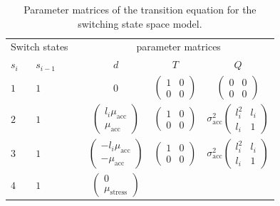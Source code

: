 \documentclass[aoas]{imsart}
\begin{document}
\begin{table}
  \caption{Parameter matrices of the transition equation for the switching state space model.\label{tab:parmats}}
\centering
\begin{tabular}[h!]{@{}llcccc@{}}
\toprule
  \multicolumn{2}{c}{Switch states} &\phantom{a}& \multicolumn{3}{c}{parameter
                                      matrices}\\
  \cmidrule{1-2} \cmidrule{4-6}
  $s_i$ & $s_{i-1}$ && $d$ & $T$ & $Q$ \\
  \midrule
  $1$ &  $1$ && 0 & $\begin{pmatrix}1&0\\0&0\end{pmatrix}$ 
                 & $\begin{pmatrix}0&0\\0&0\end{pmatrix}$\\
  $2$ & $1$ && $\begin{pmatrix} l_i\mu_{\textrm{acc}}\\ \mu_{\textrm{acc}}\end{pmatrix}$ 
                                    & $\begin{pmatrix} 1 & 0 \\ 0 &
                                      0 \end{pmatrix}$ 
        & $\sigma_{\textrm{acc}}^2\begin{pmatrix} l_i^2 & l_i\\ l_i & 1 \end{pmatrix}$\\
  $3$ & $1$ && $\begin{pmatrix} -l_i\mu_{\textrm{acc}}\\ -\mu_{\textrm{acc}}\end{pmatrix}$ 
                                    & $\begin{pmatrix} 1 & 0 \\ 0 &
                                      0 \end{pmatrix}$ 
        & $\sigma_{\textrm{acc}}^2\begin{pmatrix} l_i^2 & l_i\\ l_i & 1 \end{pmatrix}$\\
  $4$ & $1$ && $\begin{pmatrix}0\\\mu_{\textrm{stress}}\end{pmatrix}$ 

\end{tabular}
\end{table}
\end{document}
